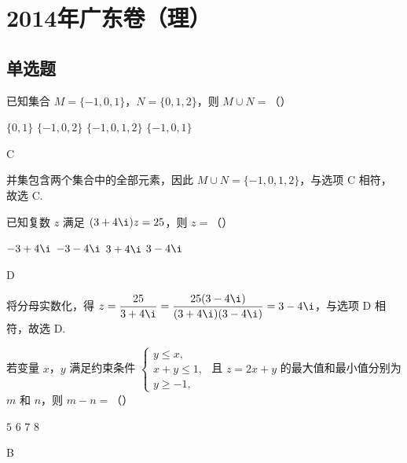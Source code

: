 \chapter{2014年广东卷（理）}

\section{单选题}

\begin{problem}
已知集合 \(M = \{-1, 0, 1\}\)，\(N = \{0, 1, 2\}\)，则 \(M \cup N =\)（\quad）

\choices
    {\(\{0, 1\}\)}
    {\(\{-1, 0, 2\}\)}
    {\(\{-1, 0, 1, 2\}\)}
    {\(\{-1, 0, 1\}\)}
\end{problem}

\begin{answer}
C
\end{answer}

\begin{solution}
并集包含两个集合中的全部元素，因此
\(M\cup N=\{-1,0,1,2\}\)，与选项 C 相符，故选 C.
\end{solution}

\begin{problem}
已知复数 \(z\) 满足 \((3 + 4\i)z = 25\)，则 \(z =\)（\quad）

\choices
    {\(-3 + 4\i\)}
    {\(-3 - 4\i\)}
    {\(3 + 4\i\)}
    {\(3 - 4\i\)}
\end{problem}

\begin{answer}
D
\end{answer}

\begin{solution}
将分母实数化，得
\(z=\dfrac{25}{3+4\i}=\dfrac{25(3-4\i)}{(3+4\i)(3-4\i)}=3-4\i\)，与选项 D 相符，故选 D.
\end{solution}

\begin{problem}
若变量 \(x\)，\(y\) 满足约束条件 \(\begin{cases}
y \leqslant x,\\
x + y \leqslant 1,\\
y \geqslant -1,
\end{cases}\) 且 \(z = 2x + y\) 的最大值和最小值分别为 \(m\) 和 \(n\)，则 \(m - n =\)（\quad）

\choices
    {\(5\)}
    {\(6\)}
    {\(7\)}
    {\(8\)}
\end{problem}

\begin{answer}
B
\end{answer}


